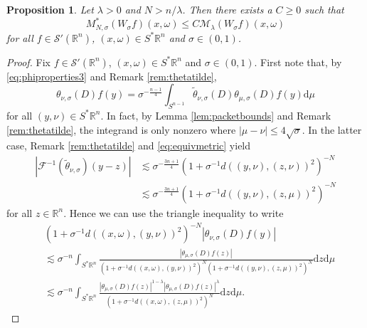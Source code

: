 \documentclass{amsart}
\newcommand {\C}{{\mathbb C}}
\newcommand {\ud}{\mathrm{d}}
\newcommand {\F}{\mathcal{F}}
\newcommand {\la}{\lambda}
\newcommand {\Rn}{\mathbb{R}^{n}}
\newcommand {\supp}{\mathrm{supp}}
\newcommand {\Sp}{S^{*}\Rn}
\newcommand {\Sw}{\mathcal{S}}
\newcommand {\w}{\omega}
\newtheorem{proposition}[theorem]{Proposition}
\theoremstyle{definition}
\numberwithin{equation}{section}
\begin{document}
\begin{proposition}\label{prop:maxineq}
Let $\lambda>0$ and $N>n/\la$. Then there exists a $C\geq0$ such that
\[
M_{N,\sigma}^{*}(W_{\sigma}f)(x,\omega)\leq C \mathcal{M}_{\lambda}(W_{\sigma}f)(x,\omega)
\]
for all $f\in \Sw'(\Rn)$, $(x,\w)\in\Sp$ and $\sigma\in(0,1)$.
\end{proposition}
\begin{proof}
Fix $f\in\Sw'(\Rn)$, $(x,\w)\in\Sp$ and $\sigma\in (0,1)$. %
%
First note that, by \eqref{eq:phiproperties3} and Remark \ref{rem:thetatilde}, 
\begin{equation}\label{eq:reprotheta}
\theta_{\nu,\sigma}(D)f(y)=\sigma^{-\frac{n-1}{4}}\int_{S^{n-1}}\tilde{\theta}_{\nu,\sigma}(D)\theta_{\mu,\sigma}(D)f(y) \ud\mu
\end{equation}
for all $(y,\nu)\in\Sp$. In fact, by Lemma \ref{lem:packetbounds} and Remark \ref{rem:thetatilde}, the integrand is only nonzero where $|\mu-\nu|\leq 4\sqrt{\sigma}$. In the latter case, Remark \ref{rem:thetatilde} and \eqref{eq:equivmetric} yield
\begin{align*}
|\F^{-1}(\tilde{\theta}_{\nu,\sigma})(y-z)|&\lesssim \sigma^{-\frac{3n+1}{4}}(1+\sigma^{-1}d((y,\nu),(z,\nu))^{2})^{-N}\\
&\lesssim \sigma^{-\frac{3n+1}{4}}(1+\sigma^{-1}d((y,\nu),(z,\mu))^{2})^{-N}
\end{align*}
for all $z\in\Rn$. Hence we can use the triangle inequality to write
\begin{align*}
&(1+\sigma^{-1}d((x,\omega),(y,\nu))^{2})^{-N}|\theta_{\nu,\sigma}(D)f(y)|\\
&\lesssim\sigma^{-n}\int_{\Sp}\frac{|\theta_{\mu,{\sigma}}(D)f(z)|}{(1+\sigma^{-1}d((x,\omega),(y,\nu))^{2})^{N}(1+\sigma^{-1}d((y,\nu),(z,\mu))^{2})^{N}}
\ud z\ud\mu\\
&\lesssim \sigma^{-n}\int_{\Sp}\frac{|
\theta_{\mu,\sigma}(D)f(z)|^{1-\lambda}|\theta_{\mu,\sigma}(D)f(z)|^{\lambda} }{(1+\sigma^{-1}d((x,\omega),(z,\mu))^{2})^{N}}\ud z\ud\mu.

\end{align*}
\end{proof}
\end{document}

